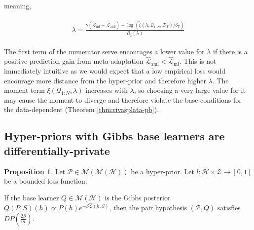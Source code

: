 \documentclass{article}
\theoremstyle{definition}
\newtheorem{proposition}[theorem]{Proposition}
\begin{document}
meaning,

\begin{align} \label{eq:meta-pb-lambda}
\begin{split}
\lambda = \frac{\gamma(\hat{\mathcal{L}}_{\mathrm{ml}}-\hat{\mathcal{L}}_{\mathrm{aml}})+\log\left (\tilde{\xi}(\lambda,\mathcal{Q}_{1:N},\mathcal{D}_T)/\delta_T\right )}{R_\xi(\lambda)}
\end{split}
\end{align}

The first term of the numerator serve encourages a lower value for $\lambda$ if there is a positive prediction gain from meta-adaptation $\hat{\mathcal{L}}_{\mathrm{aml}}<\hat{\mathcal{L}}_{\mathrm{ml}}$. This is not immediately intuitive as we would expect that a low empirical loss would encourage more distance from the hyper-prior and therefore higher $\lambda$. The moment term $\xi(\mathcal{Q}_{1:N}, \lambda)$ increases with $\lambda$, so choosing a very large value for it may cause the moment to diverge and therefore violate the base conditions for the data-dependent (Theorem \ref{thm:rivasplata-pb}). 

%
%
%

\subsection{Hyper-priors with Gibbs base learners are differentially-private} \label{append:proof-dp}

\begin{proposition} \label{thm:pair-is-dp-appendix}
	Let $\mathcal{P}\in \mathcal{M}(\mathcal{M}(\mathcal{H}))$ be a hyper-prior.
	Let $l:\mathcal{H}\times \mathcal{Z}\rightarrow [0,1]$ be a bounded loss function.
	
	If the base learner $Q\in \mathcal{M}(\mathcal{H})$ is the Gibbs posterior $Q(P, S)(h)\propto P(h)e^{-\beta\hat{\mathcal{L}}(h, S)}$, 
	then the pair hypothesis $(\mathcal{P}, Q)$ satisfies $DP\left (\frac{2\beta}{m}\right )$.
\end{proposition}
\end{document}
